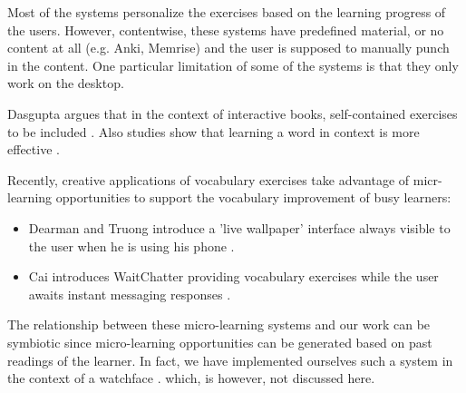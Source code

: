 Most of the systems personalize the exercises based on the learning progress of the users. However, contentwise, these systems have predefined material, or no content at all (e.g. Anki, Memrise) and the user is supposed to manually punch in the content. One particular limitation of some of the systems is that they only work on the desktop. 

Dasgupta argues that in the context of interactive books, self-contained exercises to be included \cite{Dasgupta10-Play}. Also studies show that learning a word in context is more effective \cite{nagy95-context}.






Recently, creative applications of vocabulary exercises take advantage of micr-learning opportunities to support the vocabulary improvement of busy learners:

\begin{itemize}

	\item Dearman and Truong introduce a 'live wallpaper' interface always visible to the user when he is using his phone \cite{Dear12-ImplicitAcquisition}. 

	\item Cai introduces WaitChatter providing vocabulary exercises while the user awaits instant messaging responses \cite{Cai15-wait}.

\end{itemize}

The relationship between these micro-learning systems and our work can be symbiotic since micro-learning opportunities can be generated based on past readings of the learner. In fact, we have implemented ourselves such a system in the context of a watchface \cite{Nien16-time}. which, is however, not discussed here.




